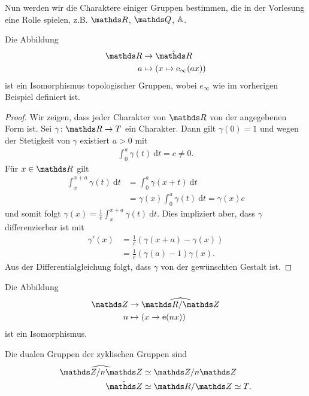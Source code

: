 Nun werden wir die Charaktere einiger Gruppen bestimmen, die in der Vorlesung eine Rolle spielen, z.B. $\R$, $\Q$, $\mathbb{A}$.

\begin{prop}
Die Abbildung
\begin{align*}
\R &\to \hat{\R}\\
a&\mapsto (x\mapsto \mathrm{e}_\infty(ax))
\end{align*}
ist ein Isomorphismus topologischer Gruppen, wobei $e_\infty$ wie im vorherigen Beispiel definiert ist.
\end{prop}
\begin{proof}
Wir zeigen, dass jeder Charakter von $\R$ von der angegebenen Form ist.
Sei $\gamma \colon \R \to T$ ein Charakter. Dann gilt $\gamma(0)=1$ und wegen der Stetigkeit von $\gamma$ existiert $a>0$ mit
\begin{align*}
\int_0^a \gamma(t)~\mathrm{d}t=c\not =0.
\end{align*}
Für $x\in \R$ gilt
\begin{align*}
\int_x^{x+a}\gamma(t)~\mathrm{d}t&= \int_0^a\gamma(x+t)~\mathrm{d}t\\
&=\gamma(x)\int_0^a \gamma(t)~\mathrm{d}t=\gamma(x)c
\end{align*}
und somit folgt $\gamma(x)=\frac{1}{c}\int_x^{x+a} \gamma(t)~\mathrm{d}t$.
Dies impliziert aber, dass $\gamma$ differenzierbar ist mit
\begin{align*}
\gamma'(x)&=\frac{1}{c}\left(\gamma(x+a)-\gamma(x)\right)\\
&= \frac{1}{c}(\gamma(a)-1)\gamma(x).
\end{align*}
Aus der Differentialgleichung folgt, dass $\gamma$ von der gewünschten Gestalt ist.
\end{proof}

\begin{prop}
Die Abbildung
\begin{align*}
\Z &\to \widehat{\R/\Z}\\
n &\mapsto (x \to \mathrm{e} (nx))
\end{align*}
ist ein Isomorphismus.
\end{prop}

\begin{prop}
Die dualen Gruppen der zyklischen Gruppen sind
\begin{align*}
\widehat{\Z/n\Z} &\simeq \Z/n\Z\\
\hat{\Z} &\simeq \R/\Z \simeq T.
\end{align*}
\end{prop}

